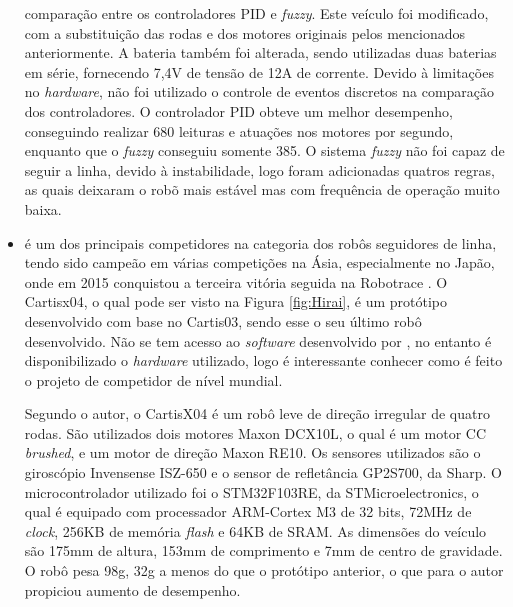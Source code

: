 \begin{itemize}
comparação entre os controladores PID e \textit{fuzzy}. Este veículo foi modificado, com a substituição das rodas e dos motores 
originais pelos mencionados anteriormente. A bateria também foi alterada, 
sendo utilizadas duas baterias em série, fornecendo 7,4V de tensão de 12A de corrente. Devido à limitações no \textit{hardware}, 
não foi utilizado o controle de eventos discretos na comparação dos controladores. O controlador PID obteve um melhor desempenho, 
conseguindo realizar 680 leituras e atuações nos motores por segundo, enquanto que o \textit{fuzzy} conseguiu somente 385. 
O sistema \textit{fuzzy} não foi capaz de seguir a linha, devido à instabilidade, 
logo foram adicionadas quatros regras, as quais deixaram o robõ mais 
estável mas com frequência de operação muito baixa. 

\item {} é um dos principais competidores na categoria dos robôs seguidores de linha, tendo sido campeão em 
várias competições na Ásia, especialmente no Japão, onde em 2015 conquistou a 
terceira vitória seguida na Robotrace \cite{robotrace2015}. 
O Cartisx04, o qual pode ser visto na Figura \ref{fig:Hirai}, é um protótipo desenvolvido com base no Cartis03, sendo esse o seu 
último robô desenvolvido. Não se tem acesso ao \textit{software} desenvolvido por , no entanto é disponibilizado o 
\textit{hardware} utilizado, logo é interessante conhecer como é feito o projeto de competidor de nível mundial.\par
%
Segundo o autor, o CartisX04 é um robô leve de direção irregular de quatro rodas. São utilizados dois motores Maxon DCX10L, 
o qual é um motor CC \textit{brushed}, e um motor de direção Maxon RE10. Os sensores utilizados são o giroscópio 
Invensense ISZ-650 e o sensor de refletância GP2S700, da Sharp. O microcontrolador utilizado foi o STM32F103RE, da 
STMicroelectronics, o qual é equipado com processador ARM-Cortex M3 de 32 bits, 72MHz de \textit{clock}, 256KB de memória 
\textit{flash} e 64KB de SRAM.
As dimensões do veículo são 175mm de altura, 153mm de comprimento e 
7mm de centro de gravidade. O robô pesa 98g, 32g a menos do que o protótipo anterior, o que para o autor propiciou aumento de 
desempenho.





\end{itemize}


